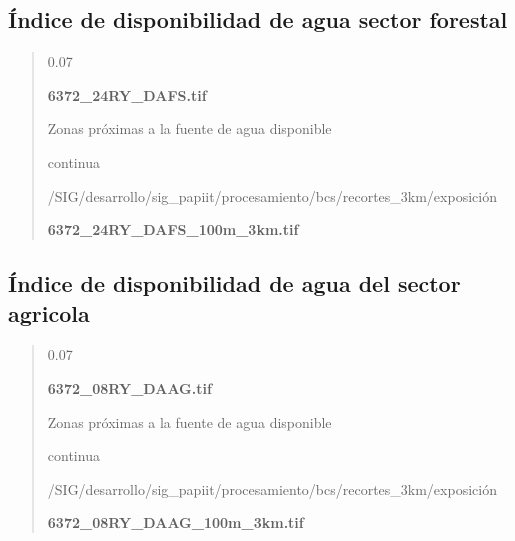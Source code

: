 \documentclass[letterpaper,10pt,spanish]{sphinxmanual}
\begin{document}
\subsection{Índice de disponibilidad de agua sector forestal}
\label{\detokenize{exposicion_bcs:indice-de-disponibilidad-de-agua-sector-forestal}}
\begin{quote}

 0.07

 {\color{red}\bfseries{}\textbar{}6372\_24RY\_DAFS.tif\textbar{}}

 Zonas próximas a la fuente de agua disponible

 continua


 /SIG/desarrollo/sig\_papiit/procesamiento/bcs/recortes\_3km/exposición

  {\color{red}\bfseries{}\textbar{}6372\_24RY\_DAFS\_100m\_3km.tif\textbar{}}
\begin{quote}

\end{quote}
\end{quote}


\subsection{Índice de disponibilidad de agua del sector agricola}
\label{\detokenize{exposicion_bcs:indice-de-disponibilidad-de-agua-del-sector-agricola}}
\begin{quote}

 0.07

 {\color{red}\bfseries{}\textbar{}6372\_08RY\_DAAG.tif\textbar{}}

 Zonas próximas a la fuente de agua disponible

 continua


 /SIG/desarrollo/sig\_papiit/procesamiento/bcs/recortes\_3km/exposición

  {\color{red}\bfseries{}\textbar{}6372\_08RY\_DAAG\_100m\_3km.tif\textbar{}}
\begin{quote}

   \textbar{}\textbar{}
\end{quote}
\end{quote}
\end{document}
